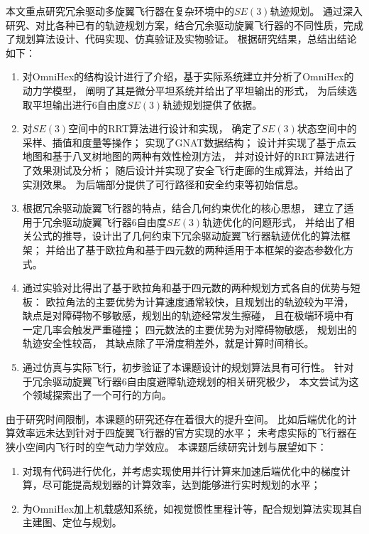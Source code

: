 
\begin{conclusions} 

本文重点研究冗余驱动多旋翼飞行器在复杂环境中的$SE(3)$轨迹规划。
通过深入研究、对比各种已有的轨迹规划方案，结合冗余驱动旋翼飞行器的不同性质，完成了规划算法设计、代码实现、仿真验证及实物验证。
根据研究结果，总结出结论如下：
\begin{enumerate}
    \renewcommand{\labelenumi}{(\theenumi)}
    \item 对OmniHex的结构设计进行了介绍，基于实际系统建立并分析了OmniHex的动力学模型，
    阐明了其是微分平坦系统并给出了平坦输出的形式，
    为后续选取平坦输出进行6自由度$SE(3)$轨迹规划提供了依据。
    \item 对$SE(3)$空间中的RRT算法进行设计和实现，
    确定了$SE(3)$状态空间中的采样、插值和度量等操作；
    实现了GNAT数据结构；
    设计并实现了基于点云地图和基于八叉树地图的两种有效性检测方法，
    并对设计好的RRT算法进行了效果测试及分析；
    随后设计并实现了安全飞行走廊的生成算法，并给出了实测效果。
    为后端部分提供了可行路径和安全约束等初始信息。
    \item 根据冗余驱动旋翼飞行器的特点，结合几何约束优化的核心思想，
    建立了适用于冗余驱动旋翼飞行器6自由度$SE(3)$轨迹优化的问题形式，
    并给出了相关公式的推导，设计出了几何约束下冗余驱动旋翼飞行器轨迹优化的算法框架；
    并给出了基于欧拉角和基于四元数的两种适用于本框架的姿态参数化方式。
    \item 通过实验对比得出了基于欧拉角和基于四元数的两种规划方式各自的优势与短板：
    欧拉角法的主要优势为计算速度通常较快，且规划出的轨迹较为平滑，
    缺点是对障碍物不够敏感，规划出的轨迹经常发生擦碰，
    且在极端环境中有一定几率会触发严重碰撞；
    四元数法的主要优势为对障碍物敏感，
    规划出的轨迹安全性较高，
    其缺点除了平滑度稍差外，就是计算时间稍长。
    \item 通过仿真与实际飞行，初步验证了本课题设计的规划算法具有可行性。
    针对于冗余驱动旋翼飞行器6自由度避障轨迹规划的相关研究极少，
本文尝试为这个领域探索出了一个可行的方向。
\end{enumerate}

由于研究时间限制，本课题的研究还存在着很大的提升空间。
比如后端优化的计算效率远未达到针对于四旋翼飞行器的官方实现的水平；
未考虑实际的飞行器在狭小空间内飞行时的空气动力学效应。
本课题后续研究计划与展望如下：
\begin{enumerate}
    \renewcommand{\labelenumi}{(\theenumi)}
    \item 对现有代码进行优化，并考虑实现使用并行计算来加速后端优化中的梯度计算，尽可能提高规划器的计算效率，达到能够进行实时规划的水平；
    \item 为OmniHex加上机载感知系统，如视觉惯性里程计等，配合规划算法实现其自主建图、定位与规划。
\end{enumerate}

\end{conclusions}

